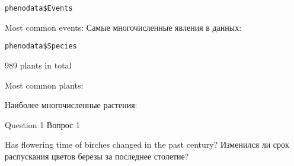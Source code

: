 \documentclass[9pt,ignorenonframetext,aspectratio=169]{beamer}
\newenvironment{Shaded}{\begin{snugshade}}{\end{snugshade}}
\newcommand{\DataTypeTok}[1]{\textcolor[rgb]{0.13,0.29,0.53}{#1}}
\newcommand{\DecValTok}[1]{\textcolor[rgb]{0.00,0.00,0.81}{#1}}
\newcommand{\KeywordTok}[1]{\textcolor[rgb]{0.13,0.29,0.53}{\textbf{#1}}}
\newcommand{\NormalTok}[1]{#1}
\newcommand{\OperatorTok}[1]{\textcolor[rgb]{0.81,0.36,0.00}{\textbf{#1}}}
\newcommand{\OtherTok}[1]{\textcolor[rgb]{0.56,0.35,0.01}{#1}}
\newcommand{\StringTok}[1]{\textcolor[rgb]{0.31,0.60,0.02}{#1}}
\begin{document}
\begin{frame}[fragile]{\texttt{phenodata\$Events}}
\protect\hypertarget{phenodataevents}{}

\bcols{} Most common events:  Самые многочисленные явления
в данных:\ecols

\scriptsize

\begin{Shaded}
\end{Shaded}

\end{frame}

\begin{frame}[fragile]{\texttt{phenodata\$Species}}
\protect\hypertarget{phenodataspecies}{}

\bcols

\footnotesize

\begin{Shaded}
\end{Shaded}

\normalsize 989 plants in total


Most common plants:

Наиболее многочисленные растения:

\scriptsize

\ecols

\end{frame}

\begin{frame}{Question 1 \textbar{} Вопрос 1}
\protect\hypertarget{question-1--1}{}

\bcols
{}

Has flowering time of birches changed in the past century? 
Изменился ли срок распускания цветов березы за последнее столетие?
\ecols

\bc {} \ec

\end{frame}
\end{document}
